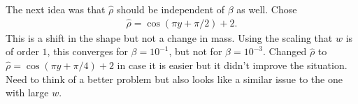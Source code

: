 \documentclass[11pt, a4paper]{article}
\theoremstyle{definition}
\begin{document}
The next idea was that $\hat \rho$ should be independent of $\beta$ as well. Chose
\begin{align*}
\hat \rho = \cos( \pi y + \pi/2) +2.
\end{align*}
This is a shift in the shape but not a change in mass. 
Using the scaling that $w$ is of order $1$, this converges for $\beta = 10^{-1}$, but not for $\beta = 10^{-3}$. Changed $\hat \rho$ to $\hat \rho = \cos( \pi y + \pi/4) +2$ in case it is easier but it didn't improve the situation.\\
Need to think of a better problem but also looks like a similar issue to the one with large $w$.
	
	
\end{document}
